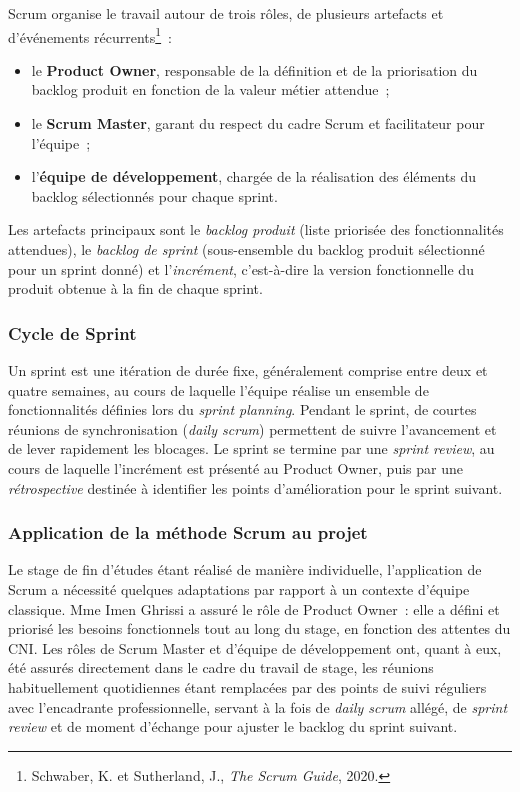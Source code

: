 Scrum organise le travail autour de trois rôles, de plusieurs artefacts et d'événements récurrents\footnote{Schwaber, K. et Sutherland, J., \emph{The Scrum Guide}, 2020.}~:

\begin{itemize}[label=--]
    \item le \textbf{Product Owner}, responsable de la définition et de la priorisation du backlog produit en fonction de la valeur métier attendue~;
    \item le \textbf{Scrum Master}, garant du respect du cadre Scrum et facilitateur pour l'équipe~;
    \item l'\textbf{équipe de développement}, chargée de la réalisation des éléments du backlog sélectionnés pour chaque sprint.
\end{itemize}

Les artefacts principaux sont le \emph{backlog produit} (liste priorisée des fonctionnalités attendues), le \emph{backlog de sprint} (sous-ensemble du backlog produit sélectionné pour un sprint donné) et l'\emph{incrément}, c'est-à-dire la version fonctionnelle du produit obtenue à la fin de chaque sprint.

\subsubsection{Cycle de Sprint}
\label{subsubsec:cycle-sprint}

Un sprint est une itération de durée fixe, généralement comprise entre deux et quatre semaines, au cours de laquelle l'équipe réalise un ensemble de fonctionnalités définies lors du \emph{sprint planning}. Pendant le sprint, de courtes réunions de synchronisation (\emph{daily scrum}) permettent de suivre l'avancement et de lever rapidement les blocages. Le sprint se termine par une \emph{sprint review}, au cours de laquelle l'incrément est présenté au Product Owner, puis par une \emph{rétrospective} destinée à identifier les points d'amélioration pour le sprint suivant.

\subsubsection{Application de la méthode Scrum au projet}
\label{subsubsec:scrum-projet}

Le stage de fin d'études étant réalisé de manière individuelle, l'application de Scrum a nécessité quelques adaptations par rapport à un contexte d'équipe classique. Mme Imen Ghrissi a assuré le rôle de Product Owner~: elle a défini et priorisé les besoins fonctionnels tout au long du stage, en fonction des attentes du CNI. Les rôles de Scrum Master et d'équipe de développement ont, quant à eux, été assurés directement dans le cadre du travail de stage, les réunions habituellement quotidiennes étant remplacées par des points de suivi réguliers avec l'encadrante professionnelle, servant à la fois de \emph{daily scrum} allégé, de \emph{sprint review} et de moment d'échange pour ajuster le backlog du sprint suivant.

